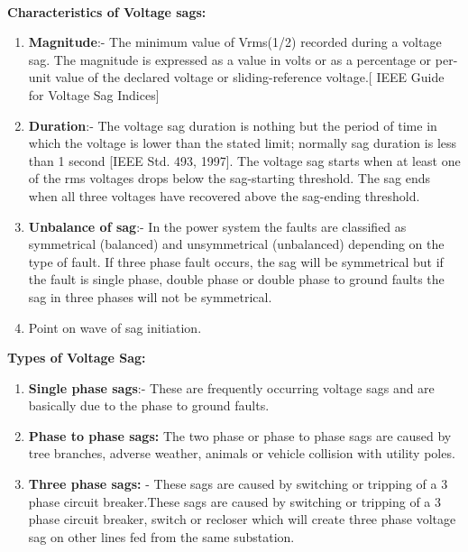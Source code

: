 \documentclass[14pt, a4paper]{extreport}
\begin{document}
\paragraph{}
\textbf{Characteristics of Voltage sags:}
\begin{enumerate}
    \item 	\textbf{Magnitude}:- The minimum value of Vrms(1/2) recorded during a voltage sag. The magnitude is expressed as a value in volts or as a percentage or per-unit value of the declared voltage or sliding-reference voltage.[ IEEE Guide for Voltage Sag Indices]
    
    \item 	\textbf{Duration}:- The voltage sag duration is nothing but the period of time in which the voltage is lower than the stated limit; normally sag duration is less than 1 second [IEEE Std. 493, 1997]. The voltage sag starts when at least one of the rms voltages drops below the sag-starting threshold. The sag ends when all three voltages have recovered above the sag-ending threshold.
    
    \item \textbf{Unbalance of sag}:- In the power system the faults are classified as symmetrical (balanced) and unsymmetrical (unbalanced) depending on the type of fault. If three phase fault occurs, the sag will be symmetrical but if the fault is single phase, double phase or double phase to ground faults the sag in three phases will not be symmetrical.
    
    \item 	Point on wave of sag initiation.
    
\end{enumerate}

\textbf{Types of Voltage Sag:}
\begin{enumerate}
    \item \textbf{Single phase sags}:- These are frequently occurring voltage sags and are basically due to the phase to ground faults.
    
    \item \textbf{Phase to phase sags:} The two phase or phase to phase sags are caused by tree branches, adverse weather, animals or vehicle collision with utility poles.
    \item \textbf{Three phase sags:} - These sags are caused by switching or tripping of a 3 phase circuit breaker.These sags are caused by switching or tripping of a 3 phase circuit breaker, switch or recloser which will create three phase voltage sag on other lines fed from the same substation.
    
    
\end{enumerate}
\end{document}
